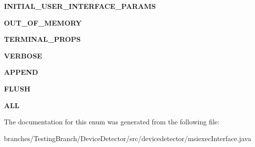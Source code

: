 \begin{DoxyCompactItemize}
\item 
\hypertarget{enumdevicedetector_1_1msiexecInterface_1_1LoggingOption_abb076a9cb119aaab36ca94efb4f24753}{{\bfseries I\-N\-I\-T\-I\-A\-L\-\_\-\-U\-S\-E\-R\-\_\-\-I\-N\-T\-E\-R\-F\-A\-C\-E\-\_\-\-P\-A\-R\-A\-M\-S}}\label{enumdevicedetector_1_1msiexecInterface_1_1LoggingOption_abb076a9cb119aaab36ca94efb4f24753}

\item 
\hypertarget{enumdevicedetector_1_1msiexecInterface_1_1LoggingOption_a81c3577e1d9f03ca2841268fabb59fd6}{{\bfseries O\-U\-T\-\_\-\-O\-F\-\_\-\-M\-E\-M\-O\-R\-Y}}\label{enumdevicedetector_1_1msiexecInterface_1_1LoggingOption_a81c3577e1d9f03ca2841268fabb59fd6}

\item 
\hypertarget{enumdevicedetector_1_1msiexecInterface_1_1LoggingOption_a9089c1c2d16ae97621614e0a6c07d831}{{\bfseries T\-E\-R\-M\-I\-N\-A\-L\-\_\-\-P\-R\-O\-P\-S}}\label{enumdevicedetector_1_1msiexecInterface_1_1LoggingOption_a9089c1c2d16ae97621614e0a6c07d831}

\item 
\hypertarget{enumdevicedetector_1_1msiexecInterface_1_1LoggingOption_afc9a62d866fa50d7268daa21cac999f4}{{\bfseries V\-E\-R\-B\-O\-S\-E}}\label{enumdevicedetector_1_1msiexecInterface_1_1LoggingOption_afc9a62d866fa50d7268daa21cac999f4}

\item 
\hypertarget{enumdevicedetector_1_1msiexecInterface_1_1LoggingOption_afba803784473a2122c31532f8835b034}{{\bfseries A\-P\-P\-E\-N\-D}}\label{enumdevicedetector_1_1msiexecInterface_1_1LoggingOption_afba803784473a2122c31532f8835b034}

\item 
\hypertarget{enumdevicedetector_1_1msiexecInterface_1_1LoggingOption_aa15cac97e5ac863b237ca691fa5ce5ad}{{\bfseries F\-L\-U\-S\-H}}\label{enumdevicedetector_1_1msiexecInterface_1_1LoggingOption_aa15cac97e5ac863b237ca691fa5ce5ad}

\item 
\hypertarget{enumdevicedetector_1_1msiexecInterface_1_1LoggingOption_a1abca400675fdff1ad3fe0c865b507c8}{{\bfseries A\-L\-L}}\label{enumdevicedetector_1_1msiexecInterface_1_1LoggingOption_a1abca400675fdff1ad3fe0c865b507c8}

\end{DoxyCompactItemize}


The documentation for this enum was generated from the following file\-:\begin{DoxyCompactItemize}
\item 
branches/\-Testing\-Branch/\-Device\-Detector/src/devicedetector/msiexec\-Interface.\-java\end{DoxyCompactItemize}
